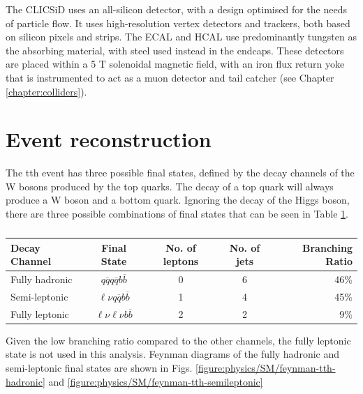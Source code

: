 The CLIC\textunderscore SiD uses an all-silicon detector, with a design optimised for the needs of particle flow. It uses high-resolution vertex detectors and trackers, both based on silicon pixels and strips. The \acrshort{ECAL} and \acrshort{HCAL} use predominantly tungsten as the absorbing material, with steel used instead in the endcaps. These detectors are placed within a 5 T solenoidal magnetic field, with an iron flux return yoke that is instrumented to act as a muon detector and tail catcher (see Chapter \ref{chapter:colliders}).

\section{Event reconstruction}
The tth event has three possible final states, defined by the decay channels of the W bosons produced by the top quarks. The decay of a top quark will always produce a W boson and a bottom quark. Ignoring the decay of the Higgs boson, there are three possible combinations of final states that can be seen in Table \ref{table:physics/final-states}. \\

\begin{table}[h]
\centering
	\begin{tabular}{ l c c c r }
	\hline \hline
	Decay Channel & Final State & No. of leptons & No. of jets & Branching Ratio \\ \hline
	Fully hadronic & $q\overline{q}q\overline{q}b\overline{b}$ & 0 & 6 & 46\% \\
	Semi-leptonic &  $\ell \nu q\overline{q}b\overline{b}$ & 1 & 4 & 45\% \\
	Fully leptonic & $\ell \nu \ell \nu b\overline{b}$ & 2 & 2 & 9\% \\ \hline \hline
	\end{tabular}
	\caption{ }
	\label{table:physics/final-states}
\end{table}

Given the low branching ratio compared to the other channels, the fully leptonic state is not used in this analysis. Feynman diagrams of the fully hadronic and semi-leptonic final states are shown in Figs. \ref{figure:physics/SM/feynman-tth-hadronic} and \ref{figure:physics/SM/feynman-tth-semileptonic}

